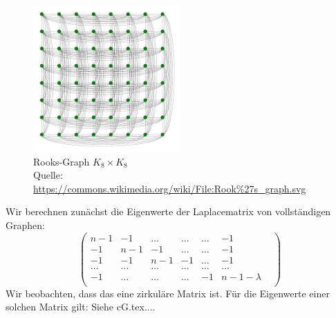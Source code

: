 \begin{figure}[H]
  \centering
 \includegraphics[width=0.5\textwidth]{Rook's_graph.png}
 \caption*{Rooks-Graph $K_8\times K_8$ \\ \tiny{Quelle: \url{https://commons.wikimedia.org/wiki/File:Rook\%27s_graph.svg}}}
 \label{rook} %
\end{figure}
\begin{Bsps}
\end{Bsps}
Wir berechnen zunächst die Eigenwerte der Laplacematrix von vollständigen Graphen:
\begin{equation}
\begin{pmatrix}
n-1&-1&\ldots&\ldots&\ldots&-1\\
-1&n-1&-1&\ldots&\ldots&-1\\
-1&-1&n-1&-1&\ldots&-1\\
\ldots&\ldots&\ldots&\ldots&\ldots&\ldots&\\
-1&\ldots&\ldots&\ldots&-1&n-1-\lambda\\
\end{pmatrix}
\end{equation}
Wir beobachten, dass das eine zirkuläre Matrix ist. 
Für die Eigenwerte einer solchen Matrix gilt: Siehe cG.tex....

